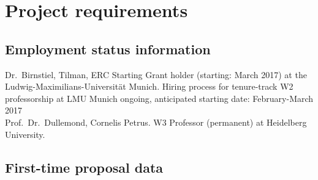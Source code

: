 \documentclass[10pt,fleqn,twoside]{article}
\begin{document}
% 
% 
% 
% 
% 
% 
% 
% 
% 
% 

\section{Project requirements}

\subsection{Employment status information}


Dr.~Birnstiel, Tilman, ERC Starting Grant holder (starting: March 2017) at
the Ludwig-Maximilians-Universit\"at Munich. Hiring process for tenure-track W2
professorship at LMU Munich ongoing, anticipated starting date: February-March
2017\\
Prof.~Dr.~Dullemond, Cornelis Petrus.
W3 Professor (permanent) at Heidelberg University.


\subsection{First-time proposal data}
\end{document}
